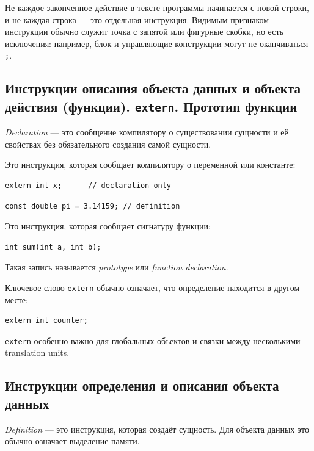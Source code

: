 \begin{remark}
Не каждое законченное действие в тексте программы начинается с новой строки, и не каждая строка — это отдельная инструкция. Видимым признаком инструкции обычно служит точка с запятой или фигурные скобки, но есть исключения: например, блок и управляющие конструкции могут не оканчиваться \texttt{;}.
\end{remark}

\subsection{Инструкции описания объекта данных и объекта действия (функции). \texttt{extern}. Прототип функции}
\begin{definition}[Описание]
\textit{Declaration} — это сообщение компилятору о существовании сущности и её свойствах без обязательного создания самой сущности.
\end{definition}

\begin{definition}
Это инструкция, которая сообщает компилятору о переменной или константе:
\begin{verbatim}
extern int x;      // declaration only
\end{verbatim}
\begin{verbatim}
const double pi = 3.14159; // definition
\end{verbatim}
\end{definition}

\begin{definition}
Это инструкция, которая сообщает сигнатуру функции:
\begin{verbatim}
int sum(int a, int b);
\end{verbatim}
Такая запись называется \textit{prototype} или \textit{function declaration}.
\end{definition}

Ключевое слово \texttt{extern} обычно означает, что определение находится в другом месте:
\begin{verbatim}
extern int counter;
\end{verbatim}

\begin{remark}
\texttt{extern} особенно важно для глобальных объектов и связки между несколькими translation units.
\end{remark}

\subsection{Инструкции определения и описания объекта данных}
\begin{definition}[Определение]
\textit{Definition} — это инструкция, которая создаёт сущность. Для объекта данных это обычно означает выделение памяти.
\end{definition}

